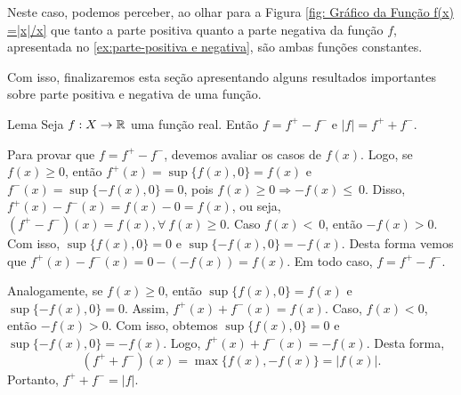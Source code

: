 Neste caso, podemos perceber, ao olhar para a Figura \ref{fig: Gráfico da Função f(x) =|x|/x} que tanto a parte positiva quanto a parte negativa da função $f$, apresentada no \ref{ex:parte-positiva e negativa}, são ambas funções constantes.

    \begin{figure}[h!]
	\centering
    \end{figure}    

Com isso, finalizaremos esta seção apresentando alguns resultados importantes sobre parte positiva e negativa de uma função.
    \begin{env}{Lema}
    \label{lem:f = f^+ - f^-}
        Seja $f: X \to \mathbb{R}$ uma função real. Então $f = f^+ - f^-$ e $|f| = f^+ + f^-$.
    \end{env}
    \begin{prova}
            Para provar que $f = f^+ - f^-$, devemos avaliar os casos de $f(x)$. 
            Logo, se $f(x) \geq 0$, então $f^+(x) = \sup\{f(x), 0\} = f(x)$ e $f^-(x) = \sup\{-f(x), 0\} = 0$, pois $f(x) \geq 0 \Rightarrow  - f(x) \leq~0$.
            Disso, $f^+(x) - f^-(x) = f(x) - 0 = f(x)$, ou seja, $(f^+ - f^-)(x) = f(x),  \forall \ f(x) \geq 0$.
            Caso $f(x) <~0$, então $- f(x) > 0$. 
            Com isso,  $\sup\{f(x), 0\} = 0$ e $\sup\{-f(x), 0\} = -f(x)$.
            Desta forma vemos que
            $f^+(x) - f^-(x) = 0 - (-f(x)) = f(x)$.
            Em todo caso, $f = f^+ - f^-$.

            Analogamente, se $f(x) \geq 0$, então  $\sup\{f(x), 0\} = f(x)$ e $\sup\{-f(x), 0\} = 0$.
            Assim, $f^+(x) + f^-(x) = f(x)$.
            Caso, $f(x) < 0$, então $ - f(x) > 0$.
            Com isso, obtemos $\sup\{f(x), 0\} = 0$ e $\sup\{-f(x), 0\} = -f(x)$.
            Logo, $f^+(x) + f^-(x) = -f(x)$.
            Desta forma, 
            $$
            (f^+ + f^-)(x) = \max\{f(x), -f(x)\} = |f(x)|.
            $$
            Portanto, $f^+ + f^- = |f|$.
    \end{prova}

